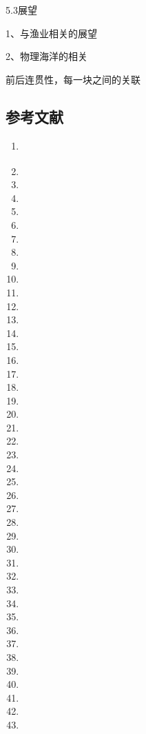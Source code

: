 \documentclass[
  12pt,
]{article}
\begin{document}
5.3展望

1、与渔业相关的展望

2、物理海洋的相关

前后连贯性，每一块之间的关联

\subsection{参考文献}\label{ux53c2ux8003ux6587ux732e}

\begin{enumerate}
\def\labelenumi{\arabic{enumi}.}
\item
  \protect{}\label{_Ref165148613}{}
\item
\item
\item
\item
\item
\item
\item
\item
\item
\item
\item
\item
\item
\item
\item
\item
\item
\item
\item
\item
\item
\item
\item
\item
\item
\item
\item
\item
\item
\item
\item
\item
\item
\item
\item
\item
\item
\item
\item
\item
\item
\item

\end{enumerate}
\end{document}
